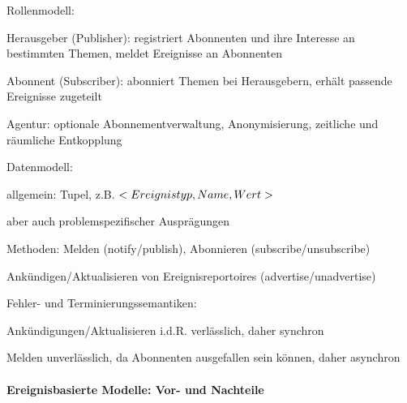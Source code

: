 \documentclass[10pt]{article}
\begin{document}
\begin{itemize*}
  \item Rollenmodell:
  \begin{itemize*}
    \item Herausgeber (Publisher): registriert Abonnenten und ihre Interesse an bestimmten Themen, meldet Ereignisse an Abonnenten
    \item Abonnent (Subscriber): abonniert Themen bei Herausgebern, erhält passende Ereignisse zugeteilt
    \item Agentur: optionale Abonnementverwaltung, Anonymisierung, zeitliche und räumliche Entkopplung
  \end{itemize*}
  \item Datenmodell:
  \begin{itemize*}
    \item allgemein: Tupel, z.B. $<Ereignistyp,\space Name,\space Wert>$
    \item aber auch problemspezifischer Ausprägungen
    \item Methoden: Melden (notify/publish), Abonnieren (subscribe/unsubscribe)
    \item Ankündigen/Aktualisieren von Ereignisreportoires (advertise/unadvertise)
  \end{itemize*}
  \item Fehler- und Terminierungssemantiken:
  \begin{itemize*}
    \item Ankündigungen/Aktualisieren i.d.R. verlässlich, daher synchron
    \item Melden unverlässlich, da Abonnenten ausgefallen sein können, daher asynchron
  \end{itemize*}
\end{itemize*}

\paragraph{Ereignisbasierte Modelle: Vor- und Nachteile}
\end{document}
